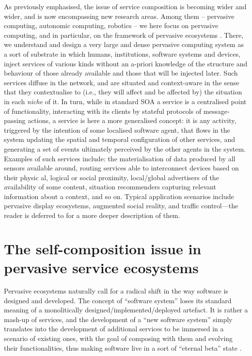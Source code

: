 \documentclass[12pt,a4paper,twoside,openright]{book}
\begin{document}
As previously emphasised, the issue of service composition is becoming wider and wider, and is now encompassing new research areas.
%
Among them -- pervasive computing, autonomic computing, robotics -- we here focus on pervasive computing, and in particular, on the framework of pervasive ecosystems \cite{ecosystems-jpcc7}.
%
There, we understand and design a very large and dense pervasive computing system as a sort of substrate in which humans, institutions, software systems and devices, inject services of various kinds without an a-priori knowledge of the structure and behaviour of those already available and those that will be injected later.
%
Such services diffuse in the network, and are situated and context-aware in the sense that they contextualise to (i.e., they will affect and be affected by) the situation in each \emph{niche} of it.
%
In turn, while in standard SOA a service is a centralised point of functionality, interacting with its clients by stateful protocols of message-passing actions, a service is here a more generalised concept: it is any activity, triggered by the intention of some localised software agent, that flows in the system updating the spatial and temporal configuration of other services, and generating a set of events ultimately perceived by the other agents in the system.
%
Examples of such services include: the materialisation of data produced by all sensors available around, routing services able to interconnect devices based on their physic	al, logical or social proximity, local/global advertisers of the availability of some content, situation recommenders capturing relevant information about a context, and so on.
%
Typical application scenarios include pervasive display ecosystems, augmented social reality, and traffic control---the reader is deferred to \cite{ecosystems-jpcc7} for a more deeper description of them.

\section{The self-composition issue in pervasive service ecosystems}

Pervasive ecosystems naturally call for a radical shift in the way software is designed and developed. The concept of ``software system'' loses its standard meaning of a monolitically designed/implemented/deployed artefact.
%
It is rather a mash-up of services, and the development of a ``new software system'' simply translates into the development of additional services to be immersed in a scenario of existing ones, with the goal of composing with them and evolving their functionalities, thus making software live in a sort of ``eternal beta'' state \cite{Kazman2009}.
\end{document}
